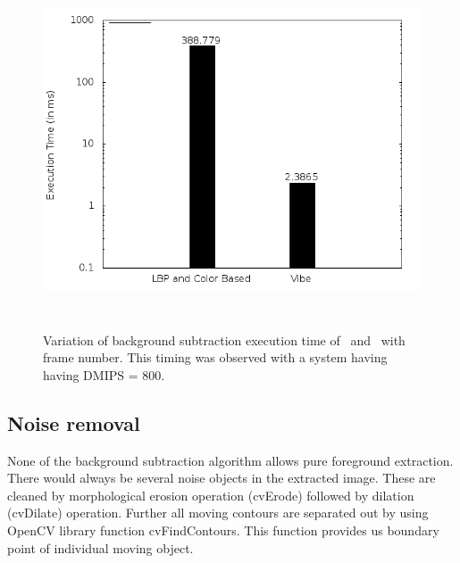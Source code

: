 \begin{figure}[!t]
\centering
\includegraphics[height=300pt]{Figures/bg_compare}
\caption{Variation of background subtraction execution time of~\cite{11}
and~\cite{9} with frame number. This timing was observed with a system
having having DMIPS = 800.}
\label{bg_compare}
\end{figure}
\subsection{Noise removal}
\indent None of the background subtraction algorithm allows pure
foreground extraction. There would always be several noise objects in the
extracted image. These are cleaned by morphological erosion operation
(cvErode) followed by dilation (cvDilate) operation. Further all moving
contours are separated out by using OpenCV library function
cvFindContours. This function provides us boundary point of individual
moving object.
